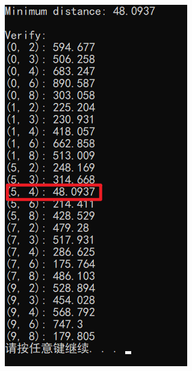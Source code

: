\documentclass[a4paper]{ctexart}
\begin{document}
\begin{sloppypar}
\begin{figure}[h]
        \includegraphics[scale=0.7]{images/run2.png}
    \end{figure}

\end{sloppypar}
\end{document}
